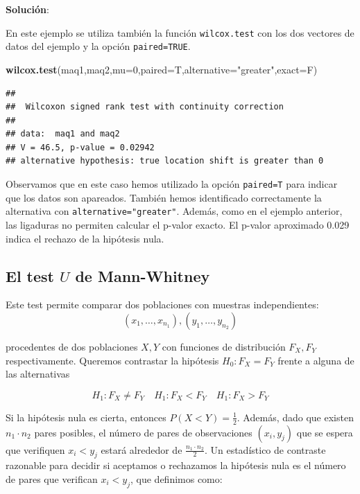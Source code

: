 \documentclass[
]{article}
\newenvironment{Shaded}{\begin{snugshade}}{\end{snugshade}}
\newcommand{\AttributeTok}[1]{\textcolor[rgb]{0.13,0.29,0.53}{#1}}
\newcommand{\DecValTok}[1]{\textcolor[rgb]{0.00,0.00,0.81}{#1}}
\newcommand{\FunctionTok}[1]{\textcolor[rgb]{0.13,0.29,0.53}{\textbf{#1}}}
\newcommand{\NormalTok}[1]{#1}
\newcommand{\StringTok}[1]{\textcolor[rgb]{0.31,0.60,0.02}{#1}}
\begin{document}
\textbf{Solución}:

En este ejemplo se utiliza también la función \texttt{wilcox.test} con los dos vectores de datos del ejemplo y la opción \texttt{paired=TRUE}.

\begin{Shaded}
\begin{Highlighting}[]
\FunctionTok{wilcox.test}\NormalTok{(maq1,maq2,}\AttributeTok{mu=}\DecValTok{0}\NormalTok{,}\AttributeTok{paired=}\NormalTok{T,}\AttributeTok{alternative=}\StringTok{"greater"}\NormalTok{,}\AttributeTok{exact=}\NormalTok{F)}
\end{Highlighting}
\end{Shaded}

\begin{verbatim}
## 
##  Wilcoxon signed rank test with continuity correction
## 
## data:  maq1 and maq2
## V = 46.5, p-value = 0.02942
## alternative hypothesis: true location shift is greater than 0
\end{verbatim}

Observamos que en este caso hemos utilizado la opción \texttt{paired=T} para indicar que los datos son apareados. También hemos identificado correctamente la alternativa con \texttt{alternative="greater"}. Además, como en el ejemplo anterior, las ligaduras no permiten calcular el p-valor exacto. El p-valor aproximado 0.029 indica el rechazo de la hipótesis nula.

\subsection{\texorpdfstring{El test \(U\) de Mann-Whitney}{El test U de Mann-Whitney}}\label{el-test-u-de-mann-whitney}

Este test permite comparar dos poblaciones con muestras independientes:
\[
\left(x_{1}, \ldots, x_{n_{1}}\right),\left(y_{1}, \ldots, y_{n_{2}}\right)
\]

procedentes de dos poblaciones \(X, Y\) con funciones de distribución \(F_{X}, F_{Y}\) respectivamente. Queremos contrastar la hipótesis \(H_{0}: F_{X}=F_{Y}\) frente a alguna de las alternativas

\[
H_{1}: F_{X} \neq F_{Y} \quad H_{1}: F_{X}<F_{Y} \quad H_{1}: F_{X}>F_{Y}
\]

Si la hipótesis nula es cierta, entonces \(P(X<Y)=\frac{1}{2}\). Además, dado que existen \(n_{1} \cdot n_{2}\) pares posibles, el número de pares de observaciones \(\left(x_{i}, y_{j}\right)\) que se espera que verifiquen \(x_{i}<y_{j}\) estará alrededor de \(\frac{n_{1} \cdot n_{2}}{2}\).
Un estadístico de contraste razonable para decidir si aceptamos o rechazamos la hipótesis nula es el número de pares que verifican \(x_{i}<y_{j}\), que definimos como:
\end{document}
